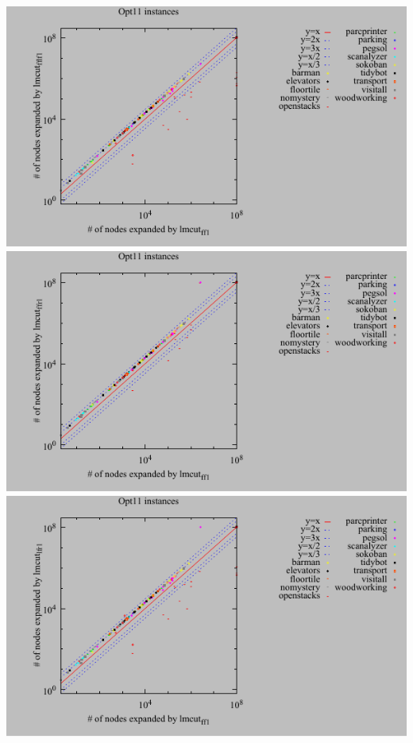 \includegraphics{tables/opt11-expanded-lmcut_ff-lmcut_fflf.pdf}
\linebreak
\includegraphics{tables/opt11-expanded-lmcut_ff-lmcut_ffr.pdf}
\linebreak
\includegraphics{tables/opt11-expanded-lmcut_ff-lmcut_lfr.pdf}
\linebreak
